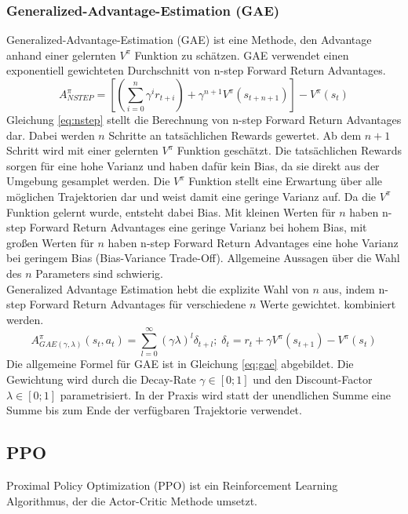 \subsubsection{Generalized-Advantage-Estimation (GAE)}
Generalized-Advantage-Estimation (GAE) ist eine Methode, den Advantage anhand einer gelernten $V^\pi$ Funktion zu schätzen. GAE verwendet einen exponentiell gewichteten Durchschnitt von n-step Forward Return Advantages.
\begin{equation}
    A^\pi_{NSTEP} = \left[ (\sum_{i=0}^n \gamma^i r_{t+i}) + \gamma^{n+1} V^\pi (s_{t+n+1}) \right] - V^\pi(s_t)
    \label{eq:nstep}
\end{equation}
Gleichung \ref{eq:nstep} stellt die Berechnung von n-step Forward Return Advantages dar. Dabei werden $n$ Schritte an tatsächlichen Rewards gewertet. Ab dem $n+1$ Schritt wird mit einer gelernten $V^\pi$ Funktion geschätzt. Die tatsächlichen Rewards sorgen für eine hohe Varianz und haben dafür kein Bias, da sie direkt aus der Umgebung gesamplet werden. Die $V^\pi$ Funktion stellt eine Erwartung über alle möglichen Trajektorien dar und weist damit eine geringe Varianz auf. Da die $V^\pi$ Funktion gelernt wurde, entsteht dabei Bias. Mit kleinen Werten für $n$ haben n-step Forward Return Advantages eine geringe Varianz bei hohem Bias, mit großen Werten für $n$ haben n-step Forward Return Advantages eine hohe Varianz bei geringem Bias (Bias-Variance Trade-Off). Allgemeine Aussagen über die Wahl des $n$ Parameters sind schwierig.\\
Generalized Advantage Estimation hebt die explizite Wahl von $n$ aus, indem n-step Forward Return Advantages für verschiedene $n$ Werte gewichtet. kombiniert werden.
\begin{equation}
    A^\pi_{GAE(\gamma,\lambda)} (s_t,a_t) = \sum_{l=0}^\infty (\gamma\lambda)^l \delta_{t+l} ;\; \delta_t = r_t + \gamma V^\pi (s_{t+1}) - V^\pi(s_t)
    \label{eq:gae}
\end{equation}
Die allgemeine Formel für GAE ist in Gleichung \ref{eq:gae} abgebildet. Die Gewichtung wird durch die Decay-Rate $\gamma \in [0;1]$ und den Discount-Factor $\lambda \in [0;1]$ parametrisiert.
In der Praxis wird statt der unendlichen Summe eine Summe bis zum Ende der verfügbaren Trajektorie verwendet. \cite{gaePaper}


\subsection{PPO}
Proximal Policy Optimization (PPO) ist ein Reinforcement Learning Algorithmus, der die Actor-Critic Methode umsetzt.

